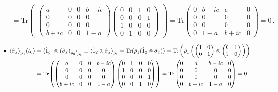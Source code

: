 \documentclass[11pt]{article}
\numberwithin{equation}{section} %
\numberwithin{figure}{section} %
\begin{document}
\begin{appendices}
\begin{equation}
\begin{split}
 &=\textrm{Tr}\begin{pmatrix}\begin{pmatrix}a&0&0&b-ic\\0&0&0&0\\0&0&0&0\\b+ic&0&0&1-a\end{pmatrix}\begin{pmatrix}0&0&1&0\\0&0&0&1\\1&0&0&0\\0&1&0&0\end{pmatrix}\end{pmatrix}=\textrm{Tr}\begin{pmatrix}0&b-ic&a&0\\0&0&0&0\\0&0&0&0\\0&1-a&b+ic&0\end{pmatrix}=0\,\textrm{.}
\end{split} 
\end{equation}
\begin{equation} \label{sigmax_otimes_one_appendix2}
\begin{split}
 \bullet\,\,\braket{\hat{\sigma}_x}_{p_0}(t_0)
 &=\braket{\hat{1}_{g_1}\otimes\left(\hat{\sigma}_x\right)_{p_0}}_{\hat{\rho}_1} \equiv\braket{\hat{1}_2\otimes\hat{\sigma}_x}_{\hat{\rho}_1}=\textrm{Tr}(\hat{\rho}_{1}(\hat{1}_2\otimes\hat{\sigma}_x))\doteq \textrm{Tr}\begin{pmatrix}\hat{\rho}_{1}\begin{pmatrix}\begin{pmatrix}1&0\\0&1\end{pmatrix}\otimes\begin{pmatrix}0&1\\1&0\end{pmatrix}\end{pmatrix}\end{pmatrix}\\
 &=\textrm{Tr}\begin{pmatrix}\begin{pmatrix}a&0&0&b-ic\\0&0&0&0\\0&0&0&0\\b+ic&0&0&1-a\end{pmatrix}\begin{pmatrix}0&1&0&0\\1&0&0&0\\0&0&0&1\\0&0&1&0\end{pmatrix}\end{pmatrix}=\textrm{Tr}\begin{pmatrix}0&a&b-ic&0\\0&0&0&0\\0&0&0&0\\0&b+ic&1-a&0\end{pmatrix}=0\,\textrm{.}

\end{split}
\end{equation}
\end{appendices}
\end{document}

